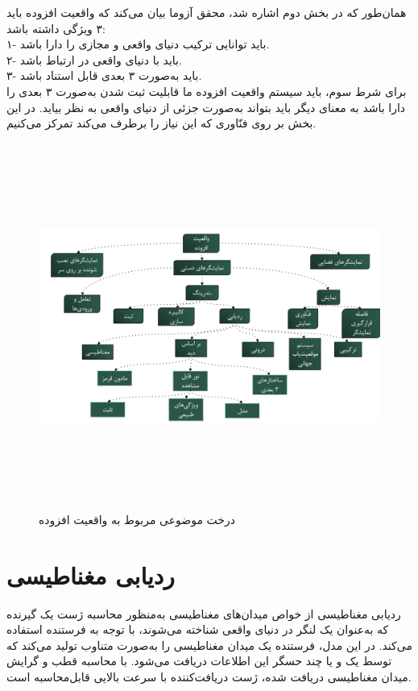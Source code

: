 همان‌طور که در بخش دوم اشاره شد، محقق آزوما بیان می‌کند که واقعیت افزوده باید ۳ ویژگی داشته باشد\cite{Azuma}:
\\
۱- باید توانایی ترکیب دنیای واقعی و مجازی را دارا باشد.
\\
۲- باید با دنیای واقعی در ارتباط باشد.
\\
۳- باید به‌صورت ۳ بعدی قابل استناد باشد.
\\
برای شرط سوم، باید سیستم واقعیت افزوده ما قابلیت ثبت شدن به‌صورت ۳ بعدی را دارا باشد به معنای دیگر باید بتواند به‌صورت جزئی از دنیای واقعی به نظر بیاید. در این بخش ‌بر روی فنّاوری که این نیاز را برطرف می‌کند تمرکز می‌کنیم.
\begin{figure}
	\centering
	\includegraphics[height=12cm,width=1\linewidth]{image/tree}
	\caption {درخت موضوعی مربوط به واقعیت افزوده}
	\label{fig:tree}
\end{figure}

\section{ردیابی مغناطیسی}
ردیابی مغناطیسی از خواص میدان‌های مغناطیسی به‌منظور محاسبه ژست یک گیرنده  که به‌عنوان یک لنگر در دنیای واقعی شناخته می‌شوند، با توجه به فرستنده استفاده می‌کند. در این مدل، فرستنده یک میدان مغناطیسی را به‌صورت متناوب تولید می‌کند که توسط یک و یا چند حسگر این اطلاعات دریافت می‌شود. با محاسبه قطب و گرایش میدان مغناطیسی دریافت شده، ژست دریافت‌کننده با سرعت بالایی قابل‌محاسبه است.

